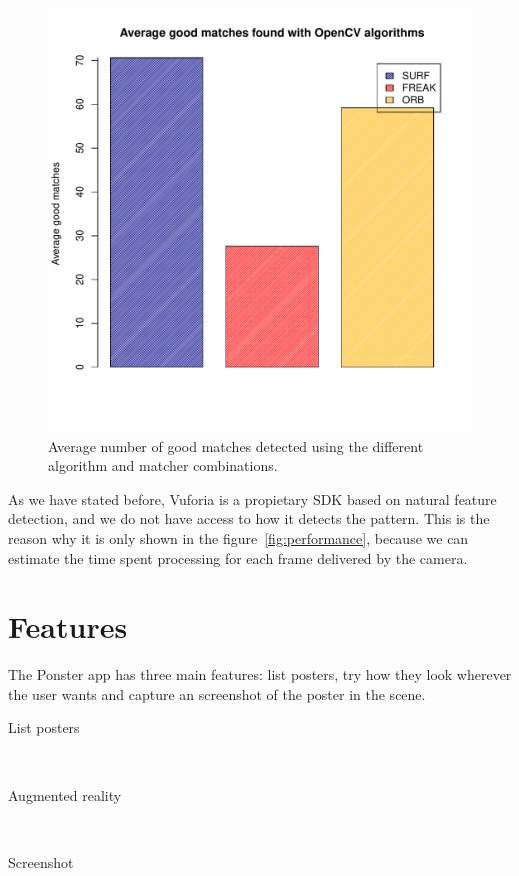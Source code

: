 \begin{figure}
\centering
\includegraphics[scale=0.75]{performance/goodmatches.pdf}
\caption{\label{fig:goodmatches} Average number of good matches detected using the
  different algorithm and matcher combinations.}
\end{figure} 

As we have stated before, Vuforia is a propietary SDK based on natural feature
detection, and we do not have access to how it detects the pattern. This is the
reason why it is only shown in the figure~\ref{fig:performance}, because we can
estimate the time spent processing for each frame delivered by the camera.

\section{Features}
The Ponster app has three main features: list posters, try how they look wherever
the user wants and capture an screenshot of the poster in the scene.

\begin{description}
\item [List posters] \hfill \\
\item [Augmented reality] \hfill \\
\item [Screenshot] \hfill \\
\end{description}

